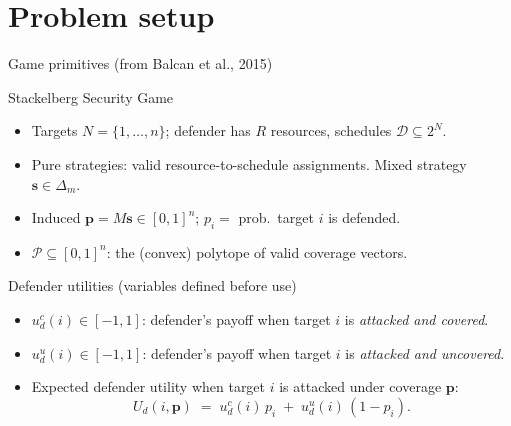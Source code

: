 \documentclass[10pt,aspectratio=169]{beamer}
\newcommand{\impcompterm}[1]{\textbf{\color{darkgreen}{#1}}}
\newcommand{\pvec}{\mathbf{p}}
\newcommand{\cP}{\mathcal{P}}
\newenvironment{greenblock}[1]{\begin{exampleblock}{#1}}{\end{exampleblock}}
\begin{document}
\section{Problem setup}

\begin{frame}{Game primitives (from Balcan et al., 2015)}
\small
\begin{greenblock}{Stackelberg Security Game}
\begin{itemize}
\item Targets $N=\{1,\dots,n\}$; defender has $R$ resources, schedules $\mathcal{D}\subseteq 2^N$.
\item Pure strategies: valid resource-to-schedule assignments. Mixed strategy $\bm{s}\in\Delta_m$.
\item Induced \impcompterm{coverage probability vector} $\pvec=M\bm{s}\in[0,1]^n$; $p_i=$ prob.\ target $i$ is defended.
\item $\cP\subseteq[0,1]^n$: the (convex) polytope of valid coverage vectors.
\end{itemize}
\end{greenblock}
\begin{block}{Defender utilities (variables defined before use)}
\begin{itemize}
\item $u_d^c(i)\in[-1,1]$: defender's payoff when target $i$ is \emph{attacked and covered}.
\item $u_d^u(i)\in[-1,1]$: defender's payoff when target $i$ is \emph{attacked and uncovered}.
\item Expected defender utility when target $i$ is attacked under coverage $\pvec$:
\[
U_d(i,\pvec)\;=\;u_d^c(i)\,p_i\;+\;u_d^u(i)\,(1-p_i).
\]
\end{itemize}
\end{block}
\end{frame}
\end{document}
